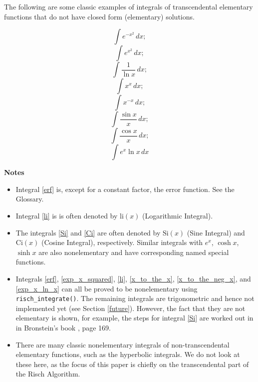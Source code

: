 \renewcommand{\thefootnote}{\fnsymbol{footnote}}	
The following are some classic examples of integrals of transcendental
elementary functions that do not have closed form (\gls{elementary})
solutions.

\begin{equation}
\label{erf}
\int{e^{-x^2}\,dx};
\end{equation}
\begin{equation}
\label{exp_x_squared}
\int{e^{x^2}\,dx};
\end{equation}
\begin{equation}
\label{li}
\int{\frac{1}{\ln{x}}\,dx};
\end{equation}
\begin{equation}
\label{x_to_the_x}
\int{x^x\,dx};
\end{equation}
\begin{equation}
\label{x_to_the_neg_x}
\int{x^{-x}\,dx};
\end{equation}
\begin{equation}
\label{Si}
\int{\frac{\sin{x}}{x}\,dx};
\end{equation}
\begin{equation}
\label{Ci}
\int{\frac{\cos{x}}{x}\,dx};
\end{equation}
\begin{equation}
\label{exp_x_ln_x}
\int{e^x\ln{x}\,dx}
\end{equation}

\textbf{Notes}
\begin{itemize}
\item Integral \ref{erf} is, except for a constant factor, the
\gls{error function}.  See the Glossary.
\item Integral \ref{li} is is often denoted by $\mathrm{li}(x)$
(Logarithmic Integral).
\item The integrals \ref{Si} and \ref{Ci} are often denoted by
$\mathrm{Si}(x)$ (Sine Integral) and $\mathrm{Ci}(x)$ (Cosine Integral),
respectively.  Similar integrals with $e^x$, $\cosh{x}$, $\sinh{x}$ are
also nonelementary and have corresponding named special functions.
\item Integrals \ref{erf}, \ref{exp_x_squared}, \ref{li},
\ref{x_to_the_x}, \ref{x_to_the_neg_x}, and \ref{exp_x_ln_x} can all be
proved to be non\-el\-e\-men\-tary using \texttt{risch\_integrate()}. 
The remaining integrals are trigonometric and hence not implemented yet
(see Section \ref{future}).  However, the fact that they are not
elementary is shown, for example, the steps  for integral \ref{Si} are
worked out in in Bronstein's book \cite{bronstein2005symbolic}, page
169.
\item There are many classic nonelementary integrals of
non-transcendental elementary functions, such as the hyperbolic
integrals.  We do not look at these here, as the focus of this paper is
chiefly on the transcendental part of the Risch Algorithm.
\end{itemize}